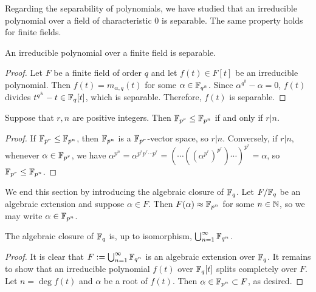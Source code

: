 Regarding the separability of polynomials, we have studied that an irreducible polynomial over a field of characteristic 0 is separable.
The same property holds for finite fields.
\begin{prop}
    An irreducible polynomial over a finite field is separable.
\end{prop}
\begin{proof}
    Let $F$ be a finite field of order $q$ and let $f(t)\in F[t]$ be an irreducible polynomial.
    Then $f(t)=m_{\alpha, q}(t)$ for some $\alpha\in{\mathbb{F}}_{q^k}$.
    Since $\alpha^{q^k}-\alpha=0$, $f(t)$ divides $t^{q^k}-t\in{\mathbb{F}}_q[t]$, which is separable.
    Therefore, $f(t)$ is separable.
\end{proof}

\begin{prop}
    Suppose that $r, n$ are positive integers.
    Then ${\mathbb{F}}_{p^r}\leq{\mathbb{F}}_{p^n}$ if and only if $r|n$.
\end{prop}
\begin{proof}
    If ${\mathbb{F}}_{p^r}\leq{\mathbb{F}}_{p^n}$, then ${\mathbb{F}}_{p^n}$ is a ${\mathbb{F}}_{p^r}$-vector space, so $r|n$.
    Conversely, if $r|n$, whenever $\alpha\in{\mathbb{F}}_{p^r}$, we have $\alpha^{p^n}=\alpha^{p^r p^r \cdots p^r}=(\cdots((\alpha^{p^r})^{p^r})\cdots)^{p^r}=\alpha$, so ${\mathbb{F}}_{p^r}\leq{\mathbb{F}}_{p^n}$.
\end{proof}

We end this section by introducing the algebraic closure of ${\mathbb{F}}_q$.
Let $F/{\mathbb{F}}_q$ be an algebraic extension and suppose $\alpha\in F$.
Then $F(\alpha)\approx{\mathbb{F}}_{p^n}$ for some $n\in{\mathbb{N}}$, so we may write $\alpha\in{\mathbb{F}}_{p^n}$.
\begin{thm}
    The algebraic closure of ${\mathbb{F}}_q$ is, up to isomorphism, $\bigcup_{n=1}^\infty {\mathbb{F}}_{q^n}$.
\end{thm}
\begin{proof}
    It is clear that $F:=\bigcup_{n=1}^\infty {\mathbb{F}}_{q^n}$ is an algebraic extension over ${\mathbb{F}}_q$.
    It remains to show that an irreducible polynomial $f(t)$ over ${\mathbb{F}}_q[t]$ splits completely over $F$.
    Let $n=\deg f(t)$ and $\alpha$ be a root of $f(t)$.
    Then $\alpha\in{\mathbb{F}}_{p^n}\subset F$, as desired.
\end{proof}